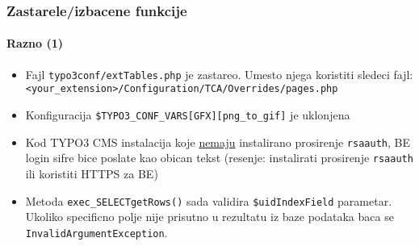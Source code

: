 \begin{frame}[fragile]
	\frametitle{Zastarele/izbacene funkcije}
	\framesubtitle{Razno (1)}

	\begin{itemize}

		\item Fajl \texttt{typo3conf/extTables.php} je zastareo.\newline
			Umesto njega koristiti sledeci fajl:\newline
			\smaller\texttt{<your\_extension>/Configuration/TCA/Overrides/pages.php}\normalsize

		\item Konfiguracija \texttt{\$TYPO3\_CONF\_VARS[GFX][png\_to\_gif]} je uklonjena

		\item Kod TYPO3 CMS instalacija koje \underline{nemaju} instalirano prosirenje 
			\texttt{rsaauth}, BE login sifre bice poslate kao obican tekst\newline
			\small(resenje: instalirati prosirenje \texttt{rsaauth} ili koristiti HTTPS za BE)\normalsize

		\item Metoda \texttt{exec\_SELECTgetRows()} sada validira \texttt{\$uidIndexField} parametar.
			Ukoliko specificno polje nije prisutno u rezultatu iz baze podataka baca se
			\texttt{InvalidArgumentException}.

	\end{itemize}

\end{frame}


